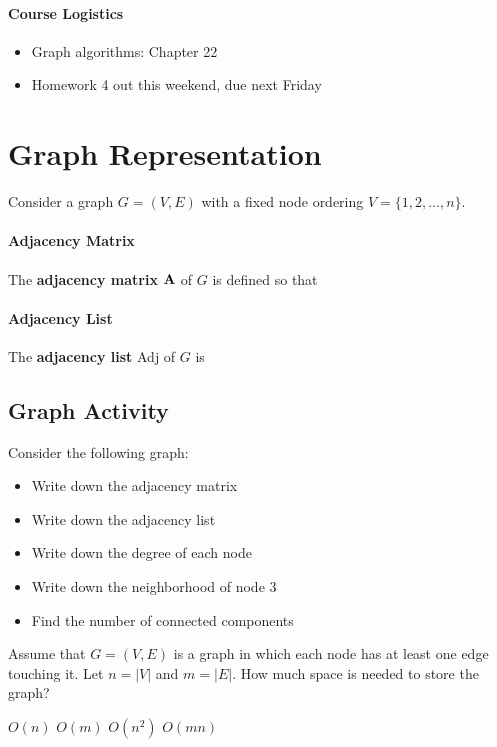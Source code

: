 \documentclass[11  pt]{exam}
\begin{document}
	
	
	
	\paragraph{Course Logistics}
	
	\begin{itemize}
		\item Graph algorithms: Chapter 22
		\item Homework 4 out this weekend, due next Friday
	\end{itemize}
	
	\section{Graph Representation}
	Consider a graph $G = (V,E)$ with a fixed node ordering $V = \{1, 2, \hdots , n\}$.
	
	\paragraph{Adjacency Matrix}
	The \textbf{adjacency matrix} $\textbf{A}$ of $G$ is defined so that
	
	\vspace{7cm}
	
	\paragraph{Adjacency List}
	The \textbf{adjacency list} Adj of $G$ is 
	
	\newpage 
	
	\subsection*{Graph Activity}
	Consider the following graph:
	
	\vs{8cm}
	
	
	\begin{itemize}
		\item Write down the adjacency matrix
		\item Write down the adjacency list 
		\item Write down the degree of each node
		\item Write down the neighborhood of node $3$
		\item Find the number of connected components
	\end{itemize}
	\begin{Qu}
		Assume that $G = (V,E)$ is a graph in which each node has at least one edge touching it. Let $n = |V|$ and $m = |E|$. How much space is needed to store the graph?
		\begin{itemize}
			\aitem $O(n)$ 
			\bitem $O(m)$
			\citem $O(n^2)$
			\ditem $O(mn)$
		\end{itemize}
	\end{Qu}
	\newpage
	
\end{document}
